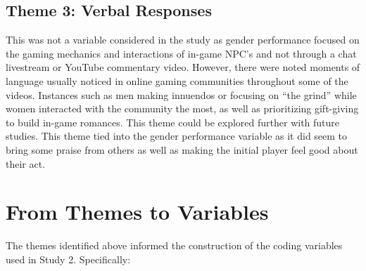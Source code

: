 \documentclass[
  12pt,
  letterpaper,
  DIV=11,
  numbers=noendperiod]{scrreprt}
\begin{document}
\subsection{Theme 3: Verbal Responses}\label{theme-3-verbal-responses}

This was not a variable considered in the study as gender performance
focused on the gaming mechanics and interactions of in-game NPC's and
not through a chat livestream or YouTube commentary video. However,
there were noted moments of language usually noticed in online gaming
communities throughout some of the videos. Instances such as men making
innuendos or focusing on ``the grind'' while women interacted with the
community the most, as well as prioritizing gift-giving to build in-game
romances. This theme could be explored further with future studies. This
theme tied into the gender performance variable as it did seem to bring
some praise from others as well as making the initial player feel good
about their act.

\section{From Themes to Variables}\label{from-themes-to-variables}

The themes identified above informed the construction of the coding
variables used in Study 2. Specifically:
\end{document}

